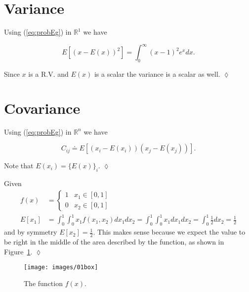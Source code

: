 \section{Variance}
\begin{example}
Using (\ref{eq:probEg}) in $\mathbb{R}^1$ we have

\begin{equation*}
E[{(x - E(x))}^2] = \int_0^\infty {(x-1)}^2 e^x dx.
\end{equation*}

Since $x$ is a R.V. and $E(x)$ is a scalar the variance is a scalar as well.
$\lozenge$
\end{example}

\section{Covariance}
\begin{example}
Using (\ref{eq:probEg}) in $\mathbb{R}^n$ we have

\begin{equation*}
C_{ij} \doteq E[(x_i - E(x_i))(x_j - E(x_j))].
\end{equation*}

Note that $E(x_i) = \lbrace E(x) \rbrace_i$.
$\lozenge$
\end{example}

\begin{example}
Given
\begin{align*}
f(x) &= \begin{cases} 1 & x_1 \in [0,1] \\ 0 & x_2 \in [0,1] \end{cases} \\
E[x_1] &= \int_0^1 \int_0^1 x_1f(x_1,x_2)dx_1dx_2 = \int_0^1 \int_0^1 x_1dx_1dx_2 = \int_0^1 \frac{1}{2}dx_2 = \frac{1}{2}
\end{align*}
and by symmetry $E[x_2] = \frac{1}{2}$.
This makes sense because we expect the value to be right in the middle of the area described by the function, as shown in Figure~\ref{fig:01box}.
$\lozenge$
\end{example}

\begin{figure}[ht!]
\centering
\texttt{[image: images/01box]}
\caption{The function $f(x)$.}%
\label{fig:01box}
\end{figure}

